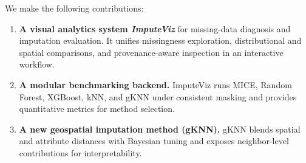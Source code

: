 \documentclass{egpubl}
\begin{document}
We make the following contributions:
\begin{enumerate}[label=\textbf{C\arabic*}, leftmargin=*]
  \item \textbf{A visual analytics system \textit{ImputeViz}} for missing-data diagnosis and imputation evaluation.
        It unifies missingness exploration, distributional and spatial comparisons, and provenance-aware inspection in an interactive workflow.

  \item \textbf{A modular benchmarking backend.}
        ImputeViz runs MICE, Random Forest, XGBoost, kNN, and gKNN under consistent masking and provides quantitative metrics for method selection.

  \item \textbf{A new geospatial imputation method (gKNN).}
        gKNN blends spatial and attribute distances with Bayesian tuning and exposes neighbor-level contributions for interpretability.
\end{enumerate}

\end{document}
